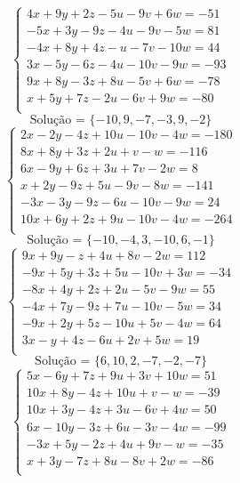 \documentclass[12pt,oneside,a4paper]{article}
\begin{document}
\vspace{\baselineskip}
\begin{equation*}
\begin{cases}
4x+9y+2z-5u-9v+6w=-51 \\
-5x+3y-9z-4u-9v-5w=81 \\
-4x+8y+4z-u-7v-10w=44 \\
3x-5y-6z-4u-10v-9w=-93 \\
9x+8y-3z+8u-5v+6w=-78 \\
x+5y+7z-2u-6v+9w=-80 \\
\end{cases}
\end{equation*}
\begin{equation*}
\text{Solução = }\{-10,9,-7,-3,9,-2\}
\end{equation*}
\vspace{\baselineskip}
\begin{equation*}
\begin{cases}
2x-2y-4z+10u-10v-4w=-180 \\
8x+8y+3z+2u+v-w=-116 \\
6x-9y+6z+3u+7v-2w=8 \\
x+2y-9z+5u-9v-8w=-141 \\
-3x-3y-9z-6u-10v-9w=24 \\
10x+6y+2z+9u-10v-4w=-264 \\
\end{cases}
\end{equation*}
\begin{equation*}
\text{Solução = }\{-10,-4,3,-10,6,-1\}
\end{equation*}
\vspace{\baselineskip}
\begin{equation*}
\begin{cases}
9x+9y-z+4u+8v-2w=112 \\
-9x+5y+3z+5u-10v+3w=-34 \\
-8x+4y+2z+2u-5v-9w=55 \\
-4x+7y-9z+7u-10v-5w=34 \\
-9x+2y+5z-10u+5v-4w=64 \\
3x-y+4z-6u+2v+5w=19 \\
\end{cases}
\end{equation*}
\begin{equation*}
\text{Solução = }\{6,10,2,-7,-2,-7\}
\end{equation*}
\vspace{\baselineskip}
\begin{equation*}
\begin{cases}
5x-6y+7z+9u+3v+10w=51 \\
10x+8y-4z+10u+v-w=-39 \\
10x+3y-4z+3u-6v+4w=50 \\
6x-10y-3z+6u-3v-4w=-99 \\
-3x+5y-2z+4u+9v-w=-35 \\
x+3y-7z+8u-8v+2w=-86 \\
\end{cases}
\end{equation*}
\end{document}
